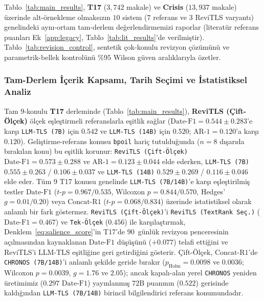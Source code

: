 ﻿\documentclass[journal]{IEEEtran}
\begin{document}
Tablo~\ref{tab:main_results}, \textbf{T17} ($3{,}742$ makale) ve \textbf{Crisis} ($13{,}937$ makale) \"{u}zerinde alt-\"{o}rnekleme olmaks{\i}z{\i}n $10$ sistem ($7$ referans ve $3$ ReviTLS varyant{\i}) genelindeki ayn{\i}-ortam tam-derlem de\u{g}erlendirmemizi raporlar (literat\"{u}r referans puanlar{\i} Ek~\ref{app:legacy}, Tablo~\ref{tab:lit_results}'de verilmi\c{s}tir). Tablo~\ref{tab:revision_control}, sentetik \c{c}ok-konulu revizyon \c{c}\"{o}z\"{u}m\"{u}n\"{u} ve parametrik-bellek kontrol\"{u}n\"{u} $\%95$ Wilson g\"{u}ven aral{\i}klar{\i}yla \"{o}zetler.

\subsubsection{Tam-Derlem \.{I}\c{c}erik Kapsam{\i}, Tarih Se\c{c}imi ve \.{I}statistiksel Analiz}
Tam $9$-konulu \textbf{T17} derleminde (Tablo~\ref{tab:main_results}), \textbf{ReviTLS (\c{C}ift-\"{O}l\c{c}ek)} \"{o}l\c{c}ek e\c{s}le\c{s}tirmeli referanslarla e\c{s}itlik sa\u{g}lar ($\text{Date-F1} = 0.544 \pm 0.283$'e kar\c{s}{\i} \texttt{LLM-TLS (7B)} i\c{c}in $0.542$ ve \texttt{LLM-TLS (14B)} i\c{c}in $0.520$; $\text{AR-1} = 0.120$'a kar\c{s}{\i} $0.120$). Geli\c{s}tirme-referans konusu \texttt{bpoil} hari\c{c} tutuldu\u{g}unda ($n=8$ d{\i}\c{s}ar{\i}da b{\i}rak{\i}lan konu) bu e\c{s}itlik korunur: \texttt{ReviTLS (\c{C}ift-\"{O}l\c{c}ek)} $\text{Date-F1} = 0.573 \pm 0.288$ ve $\text{AR-1} = 0.123 \pm 0.044$ elde ederken, \texttt{LLM-TLS (7B)} $0.555 \pm 0.263$ / $0.106 \pm 0.037$ ve \texttt{LLM-TLS (14B)} $0.529 \pm 0.269$ / $0.116 \pm 0.046$ elde eder. T\"{u}m $9$ T17 konusu genelinde \texttt{LLM-TLS (7B/14B)}'e kar\c{s}{\i} e\c{s}le\c{s}tirilmi\c{s} testler $\text{Date-F1}$ ($t\text{-}p = 0.967 / 0.535$, Wilcoxon $p = 0.844 / 0.570$, Hedges' $g = 0.01 / 0.20$) veya $\text{Concat-R1}$ ($t\text{-}p = 0.068 / 0.834$) \"{u}zerinde istatistiksel olarak anlaml{\i} bir fark g\"{o}stermez. \texttt{ReviTLS (\c{C}ift-\"{O}l\c{c}ek)}'i \texttt{ReviTLS (TextRank Se\c{c}.)} ($\text{Date-F1} = 0.467$) ve \texttt{Tek-\"{O}l\c{c}ek} ($0.456$) ile kar\c{s}{\i}la\c{s}t{\i}rmak, Denklem~\eqref{eq:salience_score}'in T17'de $90$~g\"{u}nl\"{u}k revizyon penceresinin a\c{c}{\i}lmas{\i}ndan kaynaklanan $\text{Date-F1}$ d\"{u}\c{s}\"{u}\c{s}\"{u}n\"{u} ($+0.077$) telafi etti\u{g}ini ve ReviTLS'i LLM-TLS e\c{s}itli\u{g}ine geri getirdi\u{g}ini g\"{o}sterir. \c{C}ift-\"{O}l\c{c}ek, $\text{Concat-R1}$'de \texttt{CHRONOS (7B/14B)}'i anlaml{\i} \c{s}ekilde geride b{\i}rak{\i}r ($p_{\text{Holm}} = 0.0098$ ve $0.0036$; Wilcoxon $p = 0.0039$, $g = 1.76$ ve $2.05$); ancak kapal{\i}-alan yerel \texttt{CHRONOS} yeniden \"{u}retimimiz ($0.297$ $\text{Date-F1}$) yay{\i}nlanm{\i}\c{s} $72\text{B}$ puan{\i}n{\i}n ($0.522$) gerisinde kald{\i}\u{g}{\i}ndan \texttt{LLM-TLS (7B/14B)} birincil bilgilendirici referans konumundad{\i}r.
\end{document}
